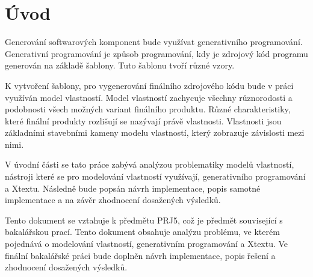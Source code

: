 \chapter{Úvod}
Generování softwarových komponent bude využívat generativního programování. Generativní programování je způsob programování, kdy je zdrojový kód programu generován na základě šablony. Tuto šablonu tvoří různé vzory.  

K vytvoření šablony, pro vygenerování finálního zdrojového kódu bude v práci využíván model vlastností. Model vlastností zachycuje všechny různorodosti a podobnosti všech možných variant finálního produktu. Různé charakteristiky, které finální produkty rozlišují se nazývají právě vlastnosti. Vlastnosti jsou základními stavebními kameny modelu vlastností, který zobrazuje závislosti mezi nimi.  

V úvodní části se tato práce zabývá analýzou problematiky modelů vlastností, nástroji které se pro modelování vlastností využívají, generativního programování a Xtextu. Následně bude popsán návrh implementace, popis samotné implementace a na závěr zhodnocení dosažených výsledků.

Tento dokument se vztahuje k předmětu PRJ5, což je předmět související s bakalářskou prací. Tento dokument obsahuje analýzu problému, ve kterém pojednává o modelování vlastností, generativním programování a Xtextu. Ve finální bakalářské práci bude doplněn návrh implementace, popis řešení a zhodnocení dosažených výsledků.

